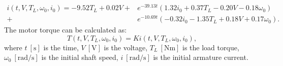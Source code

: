 \documentclass[12pt,english,twoside]{article}
\begin{document}
\begin{equation}
\begin{split}
i(t,V,T_L,\omega_0,i_0) = -9.52 T_L + 0.02 V + 
&e^{-39.13 t} (1.32 i_0 + 0.37 T_L - 0.20 V - 0.18 \omega_0) \\
+&e^{-10.69 t} (-0.32 i_0 - 1.35 T_L + 0.18 V + 
0.17 \omega_0).
\end{split}
\end{equation}
The motor torque can be calculated as:
\begin{equation}
	T(t,V,T_L,\omega_0,i_0) = K i(t,V,T_L,\omega_0,i_0),
	\label{motor_load_equation}
\end{equation}
where 
	 $t~[\text{s}]$ is the time,
	 $V~[\text{V}]$ is the voltage,
	 $T_{L}~[\text{Nm}]$ is the load torque,
	 $\omega_0~[\text{rad/s}]$ is the initial shaft speed,
	 $i~[\text{rad/s}]$ is the initial armature current.
	 	 
\end{document}
